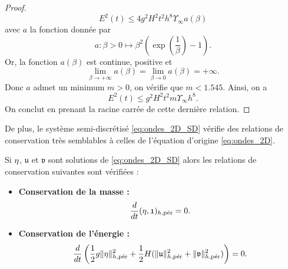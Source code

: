\begin{proof}
\begin{equation}
E^2(t) \leq 4 g^2 H^2 t^2 h^8 \Upsilon_{\infty} a(\beta)
\end{equation}
avec $a$ la fonction donnée par
\begin{equation}
a : \beta > 0 \mapsto \beta^2 \left( \exp \left(\dfrac{1}{\beta} \right) -1 \right).
\end{equation}
Or, la fonction $a(\beta)$ est continue, positive et
\begin{equation}
\lim_{\beta \rightarrow + \infty} a(\beta) = \lim_{\beta \rightarrow 0} a(\beta) = + \infty.
\end{equation}
Donc $a$ admet un minimum $m>0$, on vérifie que $m < 1.545$. Ainsi, on a
\begin{equation}
E^2(t) \leq g^2 H^2 t^2 m \Upsilon_{\infty} h^8.
\end{equation}
On conclut en prenant la racine carrée de cette dernière relation.
\end{proof}

De plus, le système semi-discrétisé \eqref{eq:ondes_2D_SD} vérifie des relations de conservation très semblables à celles de l'équation d'origine \eqref{eq:ondes_2D}.

\begin{proposition}
Si $\etafrak$, $\mathfrak{u}$ et $\mathfrak{v}$ sont solutions de \eqref{eq:ondes_2D_SD} alors les relations de conservation suivantes sont vérifiées :
\begin{itemize}
\item \textbf{Conservation de la masse :}
\begin{equation}
\dfrac{d}{dt} (\etafrak, \mathfrak{1})_{h,\per} = 0.
\end{equation}
\item \textbf{Conservation de l'énergie :}
\begin{equation}
\dfrac{d}{dt} \left( \dfrac{1}{2} g \| \etafrak \|_{h,\per}^2 + \dfrac{1}{2} H ( \| \mathfrak{u} \|_{h,\per}^2 +  \| \mathfrak{v} \|_{h,\per}^2) \right) = 0.
\end{equation}
\end{itemize}
\end{proposition}


